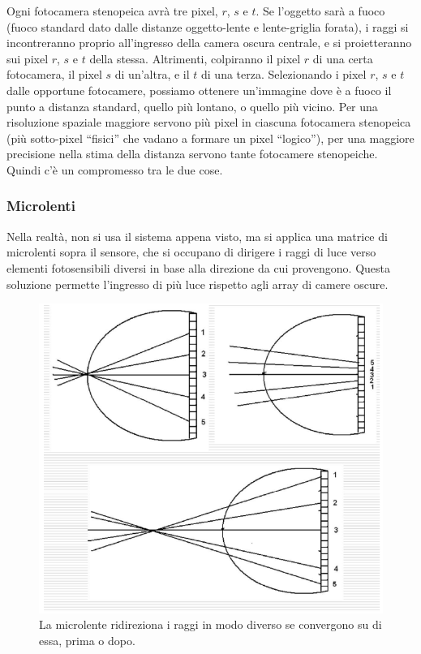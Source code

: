 \documentclass[a4paper,11pt]{article}
\begin{document}
Ogni fotocamera stenopeica avrà tre pixel, $r$, $s$ e $t$. Se l'oggetto sarà a fuoco (fuoco standard dato dalle distanze oggetto-lente e lente-griglia forata), i raggi
si incontreranno proprio all'ingresso della camera oscura centrale, e si proietteranno sui pixel $r$, $s$ e $t$ della stessa.
Altrimenti, colpiranno il pixel $r$ di una certa fotocamera, il pixel $s$ di un'altra, e il $t$ di una terza.
Selezionando i pixel $r$, $s$ e $t$ dalle opportune fotocamere, possiamo ottenere un'immagine dove è a fuoco il punto a distanza standard, quello più lontano, o quello più vicino.
Per una risoluzione spaziale maggiore servono più pixel in ciascuna fotocamera stenopeica (più sotto-pixel ``fisici'' che vadano a formare un pixel ``logico''), per una maggiore precisione
nella stima della distanza servono tante fotocamere stenopeiche. Quindi c'è un compromesso tra le due cose.

\subsubsection{Microlenti}
Nella realtà, non si usa il sistema appena visto, ma si applica una matrice di microlenti sopra il sensore, che si occupano di dirigere i raggi di luce verso elementi fotosensibili
diversi in base alla direzione da cui provengono. Questa soluzione permette l'ingresso di più luce rispetto agli array di camere oscure.

\renewcommand{\thefigure}{3.26}
\begin{figure}[!h]
  \centering
    \includegraphics[scale=0.4]{images/3/microlenses.png}
    \caption{La microlente ridireziona i raggi in modo diverso se convergono su di essa, prima o dopo.}
\end{figure}
\end{document}
